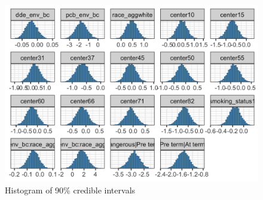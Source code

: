 \documentclass[10pt]{jmlr}%
\begin{document}
\begin{figure}
	\centering
	\includegraphics[width=\textwidth]{hists.jpeg}
	\caption{Histogram of 90\% credible intervals}
	\label{fig:hists}
\end{figure}

%
\end{document}
